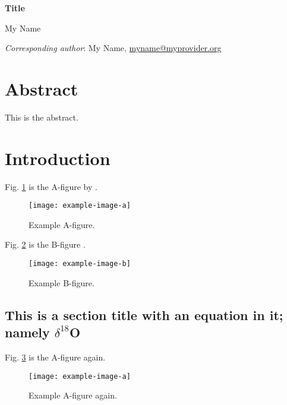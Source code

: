 \documentclass[11pt]{article} %
\begin{document}
\thispagestyle{empty} %
\begin{center}

\vspace*{2cm}
\LARGE{\textbf{Title}}\\
\vspace{2cm}

\normalsize
My Name

\end{center}
\vfill
\textit{Corresponding author}: My Name, \href{mailto:me.de}{myname@myprovider.org}

\newpage
{} %

\section*{Abstract}

This is the abstract.

\section{Introduction}

Fig. \ref{fig:a} is the A-figure by \citet{einstein}.

\begin{figure}[H]
\centering\noindent\texttt{[image: example-image-a]}
\caption{Example A-figure.}
\label{fig:a}
\end{figure}

Fig. \ref{fig:b} is the B-figure \citep{einstein}.

\begin{figure}[H]
\centering\noindent\texttt{[image: example-image-b]}
\caption{Example B-figure.}
\label{fig:b}
\end{figure}

\subsection{This is a section title with an equation in it; namely \texorpdfstring{$\delta^{18}$}{d}O}

Fig. \ref{fig:a2} is the A-figure again.

\begin{figure}[H]
\centering\noindent\texttt{[image: example-image-a]}
\caption{Example A-figure again.}
\label{fig:a2}
\end{figure}
\end{document}
